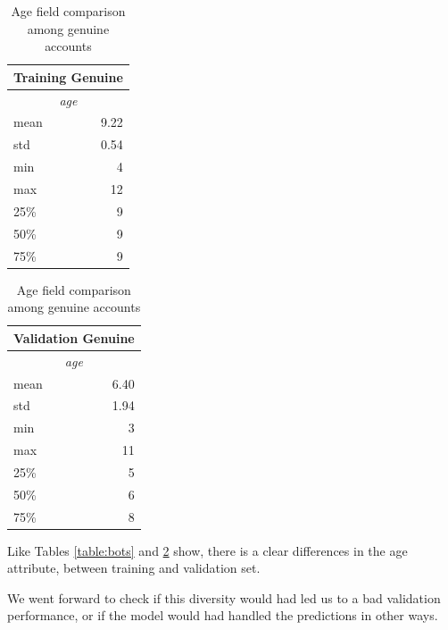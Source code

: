 \begin{table}[!htb]
	\caption{Age field comparison among genuine accounts}
	\begin{center}
		\begin{tabular}{@{}lr@{}}
			\multicolumn{2}{c}{\textbf{Training Genuine}}\\
			\hline\hline
			\multicolumn{2}{c}{\textit{age}}\\
			\hline
			\multicolumn{1}{l}{mean}& \multicolumn{1}{r}{9.22}\\
			\multicolumn{1}{l}{std}& \multicolumn{1}{r}{0.54}\\
			\multicolumn{1}{l}{min}& \multicolumn{1}{r}{4}\\
			\multicolumn{1}{l}{max}& \multicolumn{1}{r}{12}\\
			\multicolumn{1}{l}{25\%}& \multicolumn{1}{r}{9}\\
			\multicolumn{1}{l}{50\%}& \multicolumn{1}{r}{9}\\
			\multicolumn{1}{l}{75\%}& \multicolumn{1}{r}{9}\\
			\hline\hline
		\end{tabular}
		\begin{tabular}{@{}lr@{}}
			\multicolumn{2}{c}{\textbf{Validation Genuine}}\\
			\hline\hline
			\multicolumn{2}{c}{\textit{age}}\\
			\hline
			\multicolumn{1}{l}{mean}& \multicolumn{1}{r}{6.40}\\
			\multicolumn{1}{l}{std}& \multicolumn{1}{r}{1.94}\\
			\multicolumn{1}{l}{min}& \multicolumn{1}{r}{3}\\
			\multicolumn{1}{l}{max}& \multicolumn{1}{r}{11}\\
			\multicolumn{1}{l}{25\%}& \multicolumn{1}{r}{5}\\
			\multicolumn{1}{l}{50\%}& \multicolumn{1}{r}{6}\\
			\multicolumn{1}{l}{75\%}& \multicolumn{1}{r}{8}\\
			\hline\hline
		\end{tabular}
	\end{center}
	\label{table:genuine}
\end{table}

Like Tables \ref{table:bots} and \ref{table:genuine} show, there is a clear differences in the age attribute, between training and validation set.

We went forward to check if this diversity would had led us to a bad validation performance, or if the model would had handled the predictions in other ways.

